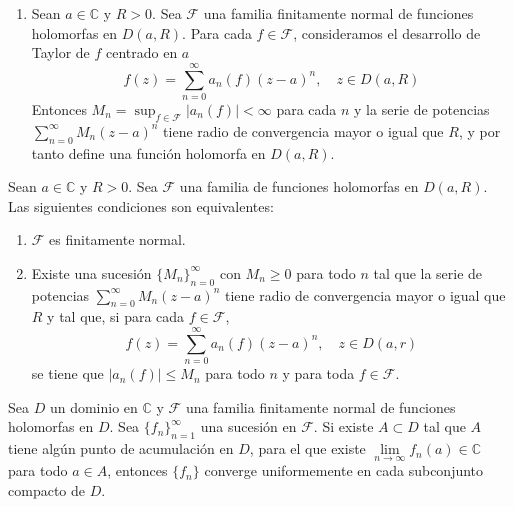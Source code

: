 \begin{example}
\begin{enumerate}
        \item Sean $a \in \mathbb{C}$ y $R > 0$.
              Sea $\mathcal{F}$ una familia finitamente normal de funciones holomorfas en $D(a, R)$.
              Para cada $f \in \mathcal{F}$, consideramos el desarrollo de Taylor de $f$ centrado en $a$
              $$f(z) = \sum_{n=0}^\infty a_n(f)(z-a)^n, \quad z \in D(a, R)$$
              Entonces $M_n = \sup_{f \in \mathcal{F}} |a_n(f)| < \infty$ para cada $n$ y la serie de potencias $\sum_{n=0}^\infty M_n(z-a)^n$ tiene radio de convergencia mayor o igual que $R$, y por tanto define una función holomorfa en $D(a, R)$.


    \end{enumerate}
\end{example}

\begin{theorem}
    Sean $a \in \mathbb{C}$ y $R > 0$.
    Sea $\mathcal{F}$ una familia de funciones holomorfas en $D(a, R)$.
    Las siguientes condiciones son equivalentes:
    \begin{enumerate}
        \item $\mathcal{F}$ es finitamente normal.
        \item Existe una sucesión $\{M_n\}_{n=0}^\infty$ con $M_n \geq 0$ para todo $n$ tal que la serie de potencias $\sum_{n=0}^\infty M_n(z-a)^n$ tiene radio de convergencia mayor o igual que $R$ y tal que, si para cada $f \in \mathcal{F}$,
              $$f(z) = \sum_{n=0}^\infty a_n(f)(z-a)^n, \quad z \in D(a, r)$$
              se tiene que $|a_n(f)| \leq M_n$ para todo $n$ y para toda $f \in \mathcal{F}$.
    \end{enumerate}
\end{theorem}

\begin{theorem}
    Sea $D$ un dominio en $\mathbb{C}$ y $\mathcal{F}$ una familia finitamente normal de funciones holomorfas en $D$.
    Sea $\{f_n\}_{n=1}^\infty$ una sucesión en $\mathcal{F}$.
    Si existe $A \subset D$ tal que $A$ tiene algún punto de acumulación en $D$, para el que existe $\lim\limits_{n \to \infty} f_n(a) \in \mathbb{C}$ para todo $a \in A$, entonces $\{f_n\}$ converge uniformemente en cada subconjunto compacto de $D$.
\end{theorem}



